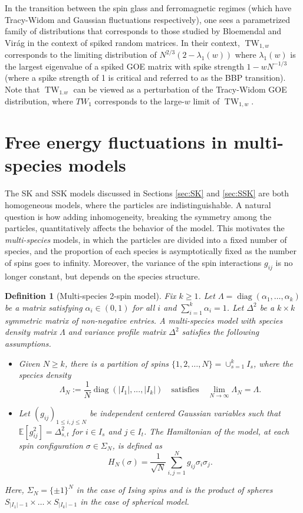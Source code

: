 \documentclass[11pt]{article}
\numberwithin{equation}{section}
\DeclareMathOperator*{\diag}{diag}
\newcommand{\beqq}{ \begin{equation*} }
\newcommand{\eeqq}{ \end{equation*} }
\def \a {\alpha}
\def \la {\lambda}
\def \s {\sigma}
\newcommand{\bE}{\mathbb{E}}
\newtheorem{definition}[theorem]{Definition}
\theoremstyle{remark}
\DeclareMathOperator{\TW}{TW}
\begin{document}
In the transition between the spin glass and ferromagnetic regimes (which have Tracy-Widom and Gaussian fluctuations respectively), one sees a parametrized family of distributions that corresponds to those studied by Bloemendal and Vir\'ag \cite{Bloemendal_2012} in the context of spiked random matrices.  In their context,  $\TW_{1,w}$ corresponds to the limiting distribution of $N^{2/3}(2-\la_1(w))$ where $\la_1(w)$ is the largest eigenvalue of a spiked GOE matrix with spike strength $1-wN^{-1/3}$ (where a spike strength of 1 is critical and referred to as the BBP transition).  Note that $\TW_{1.w}$ can be viewed as a perturbation of the Tracy-Widom GOE distribution, where $TW_1$ corresponds to the large-$w$ limit of $\TW_{1,w}$.




\section{Free energy fluctuations in multi-species models}\label{sec:multispecies}

The SK and SSK models discussed in Sections \ref{sec:SK} and \ref{sec:SSK} are both homogeneous models, where the particles are indistinguishable. A natural question is how adding inhomogeneity, breaking the symmetry among the particles, quantitatively affects the behavior of the model. This motivates the \textit{multi-species} models, in which the particles are divided into a fixed number of species, and the proportion of each species is asymptotically fixed as the number of spins goes to infinity. Moreover, the variance of the spin interactions $g_{ij}$ is no longer constant, but depends on the species structure.

\begin{definition}[Multi-species 2-spin model]
    Fix $k\geq 1$. Let $\Lambda = \diag(\a_1,\dots, \a_k)$ be a matrix satisfying $\a_i\in (0,1)$ for all $i$ and $\sum_{i=1}^k \a_i=1$. Let $\Delta^2$ be a $k\times k$ symmetric matrix of non-negative entries. 
    A multi-species model with species density matrix $\Lambda$ and variance profile matrix $\Delta^2$ satisfies the following assumptions.
    \begin{itemize}
        \item Given $N \geq k$, there is a partition of spins $\{1,2,\dots, N\} = \cup_{s=1}^k I_s$, where the species density
        \[
        \Lambda_N:=\frac1N\diag(|I_1|,...,|I_k|) \quad \text{satisfies} \quad \lim_{N\to\infty}\Lambda_N=\Lambda.
        \]
        \item Let $(g_{ij})_{1 \leq i, j\leq N}$ be independent centered Gaussian variables such that $\bE[g_{ij}^2] = \Delta^2_{s,t}$ for $i\in I_s$ and $j\in I_t$. The Hamiltonian of the model, at each spin configuration $\s\in \Sigma_N$, is defined as
        \beqq
        H_N(\s) = \frac1{\sqrt N}\sum_{i,j=1}^N g_{ij}\s_i\s_j.
        \eeqq
    \end{itemize}
    Here, $\Sigma_N = \{\pm 1\}^N$ in the case of Ising spins and is the product of spheres $S_{|I_1|-1}  \times  \dots \times S_{|I_k|-1}$ in the case of spherical model. 
\end{definition}
\end{document}
